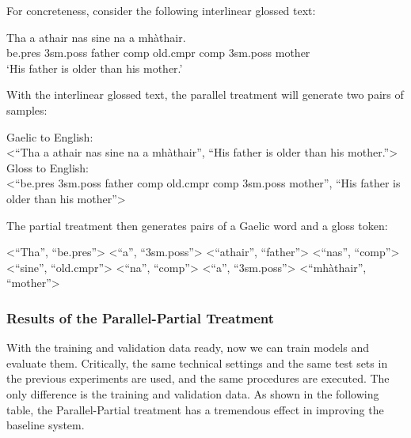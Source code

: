 \documentclass[a4paper]{article}
\begin{document}
For concreteness, consider the following interlinear glossed text: 
\begin{exe}  
\ex \gll    Tha a athair nas sine na a mh\`athair.\\  
            be.pres 3sm.poss father comp old.cmpr comp 3sm.poss mother\\  
    \glt    `His father is older than his mother.'  
\end{exe}

With the interlinear glossed text, the parallel treatment will generate two pairs of samples:

\begin{exe}
	\ex
	\begin{xlist}
		\ex Gaelic to English: \\<``Tha a athair nas sine na a mh\`athair'', ``His father is older than his mother.''>
		\ex Gloss to English: \\<``be.pres 3sm.poss father comp old.cmpr comp 3sm.poss mother'', ``His father is older than his mother''>
	\end{xlist}
\end{exe}

The partial treatment then generates pairs of a Gaelic word and a gloss token: 
\begin{exe}
	\ex
	\begin{xlist}
		\ex <``Tha'', ``be.pres''>
		\ex <``a'', ``3sm.poss''>
		\ex <``athair'', ``father''>
		\ex <``nas'', ``comp''>
		\ex <``sine'', ``old.cmpr''>
		\ex <``na'', ``comp''>
		\ex <``a'', ``3sm.poss''>
		\ex <``mh\`athair'', ``mother''>
	\end{xlist}
\end{exe}

\subsubsection{Results of the Parallel-Partial Treatment}

With the training and validation data ready, now we can train models and evaluate them. Critically, the same technical settings and the same test sets in the previous experiments are used, and the same procedures are executed. The only difference is the training and validation data. As shown in the following table, the Parallel-Partial treatment has a tremendous effect in improving the baseline system.        
\end{document}

